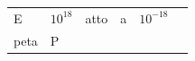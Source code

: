 {{\begin{center}
\begin{xtabular}[t]{|l|l|l|l|l|l|}
        E &
    
    
        
                \begin{math}{10}^{18}\end{math}
               &
    
    
        atto &
    
    
        a &
    
    
        
                \begin{math}{10}^{-18}\end{math}
     \tabularnewline{}
    
    
        peta &
    
    
        P &
    
    
        

\end{xtabular}
\end{center}}}
